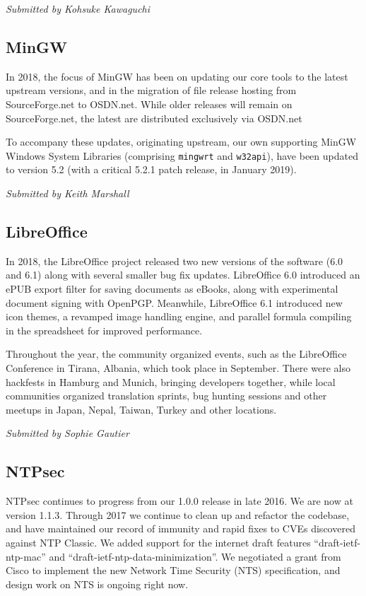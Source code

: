 \documentclass[a4paper]{report}
\begin{document}
{\em Submitted by Kohsuke Kawaguchi}

\subsection{MinGW}

In 2018, the focus of MinGW has been on updating our core tools to the
latest upstream versions, and in the migration of file release hosting
from SourceForge.net to OSDN.net.  While older releases will remain on
SourceForge.net, the latest are distributed exclusively via OSDN.net

To accompany these updates, originating upstream, our own supporting
MinGW Windows System Libraries (comprising \texttt{mingwrt} and
\texttt{w32api}), have been updated to version 5.2 (with a critical
5.2.1 patch release, in January 2019).

{\em Submitted by Keith Marshall}

\subsection{LibreOffice}

In 2018, the LibreOffice project released two new versions of the
software (6.0 and 6.1) along with several smaller bug fix updates.
LibreOffice 6.0 introduced an ePUB export filter for saving documents as
eBooks, along with experimental document signing with OpenPGP.
Meanwhile, LibreOffice 6.1 introduced new icon themes, a revamped image
handling engine, and parallel formula compiling in the spreadsheet for
improved performance.

Throughout the year, the community organized events, such as the
LibreOffice Conference in Tirana, Albania, which took place in
September. There were also hackfests in Hamburg and Munich, bringing
developers together, while local communities organized translation
sprints, bug hunting sessions and other meetups in Japan, Nepal, Taiwan,
Turkey and other locations.

{\em Submitted by Sophie Gautier}

\subsection{NTPsec}

NTPsec continues to progress from our 1.0.0 release in late 2016.  We
are now at version 1.1.3.  Through 2017 we continue to clean up and
refactor the codebase, and have maintained our record of immunity and
rapid fixes to CVEs discovered against NTP Classic.  We added support
for the internet draft features ``draft-ietf-ntp-mac'' and
``draft-ietf-ntp-data-minimization''.  We negotiated a grant from Cisco
to implement the new Network Time Security (NTS) specification, and
design work on NTS is ongoing right now.
\end{document}
